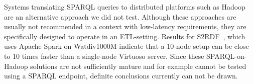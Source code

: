 Systems translating SPARQL queries to distributed platforms such as Hadoop~\cite{cure2015evaluation, graux2016multi} are an alternative approach we did not test. Although these approaches are usually not recommended in a context with low-latency requirements, they are specifically designed to operate in an ETL-setting. 
Results for S2RDF~\cite{Schatzle:2016:SRQ:2977797.2977806}, which uses Apache Spark on Watdiv1000M indicate that a 10-node setup can be close to 10 times faster than a single-node Virtuoso server. Since these SPARQL-on-Hadoop solutions are not sufficiently mature and for example cannot be tested using a SPARQL endpoint, definite conclusions currently can not be drawn. 
